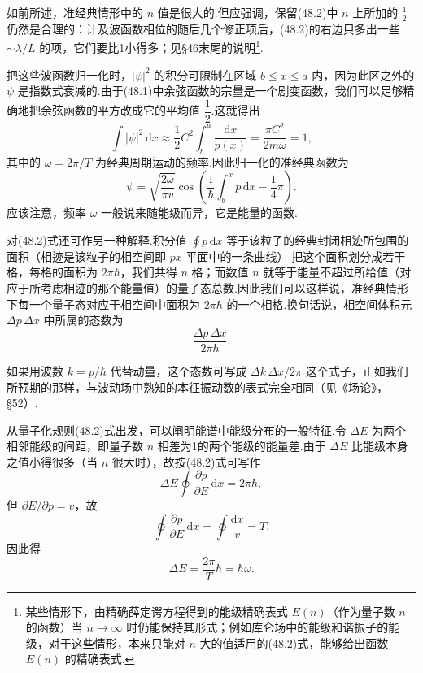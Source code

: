 如前所述，准经典情形中的 $n$ 值是很大的.但应强调，保留(48.2)中 $n$ 上所加的 $\frac{1}{2}$ 仍然是合理的：计及波函数相位的随后几个修正项后，(48.2)的右边只多出一些 $\sim\lambda/L$ 的项，它们要比1小得多；见§46末尾的说明\footnote{某些情形下，由精确薛定谔方程得到的能级精确表式 $E(n)$（作为量子数 $n$ 的函数）当 $n\to\infty$ 时仍能保持其形式；例如库仑场中的能级和谐振子的能级，对于这些情形，本来只能对 $n$ 大的值适用的(48.2)式，能够给出函数 $E(n)$ 的精确表式.}.

把这些波函数归一化时，$|\psi|^2$ 的积分可限制在区域 $b\leqslant x\leqslant a$ 内，因为此区之外的 $\psi$ 是指数式衰减的.由于(48.1)中余弦函数的宗量是一个剧变函数，我们可以足够精确地把余弦函数的平方改成它的平均值 $\dfrac{1}{2}$.这就得出
\begin{equation*}
  \int|\psi|^2\,\mathrm{d}x\approx\frac{1}{2}C^2\int_b^a\frac{\mathrm{d}x}{p(x)}
  =\frac{\pi C^2}{2m\omega}=1,
\end{equation*}
其中的 $\omega=2\pi/T$ 为经典周期运动的频率.因此归一化的准经典函数为
\begin{equation}
  \psi=\sqrt{\frac{2\omega}{\pi v}}\cos\left(\frac{1}{\hbar}\int_b^x p\,\mathrm{d}x-\frac{1}{4}\pi\right).
\end{equation}
应该注意，频率 $\omega$ 一般说来随能级而异，它是能量的函数.

对(48.2)式还可作另一种解释.积分值 $\oint p\,\mathrm{d}x$ 等于该粒子的经典封闭相迹所包围的面积（相迹是该粒子的相空间即 $px$ 平面中的一条曲线）.把这个面积划分成若干格，每格的面积为 $2\pi\hbar$，我们共得 $n$ 格；而数值 $n$ 就等于能量不超过所给值（对应于所考虑相迹的那个能量值）的量子态总数.因此我们可以这样说，准经典情形下每一个量子态对应于相空间中面积为 $2\pi\hbar$ 的一个相格.换句话说，相空间体积元 $\Delta p\,\Delta x$ 中所属的态数为
\begin{equation}
  \frac{\Delta p\,\Delta x}{2\pi\hbar}.
\end{equation}

如果用波数 $k=p/\hbar$ 代替动量，这个态数可写成 $\Delta k\,\Delta x/2\pi$ 这个式子，正如我们所预期的那样，与波动场中熟知的本征振动数的表式完全相同（见《场论》，§52）.

从量子化规则(48.2)式出发，可以阐明能谱中能级分布的一般特征.令 $\Delta E$ 为两个相邻能级的间距，即量子数 $n$ 相差为1的两个能级的能量差.由于 $\Delta E$ 比能级本身之值小得很多（当 $n$ 很大时），故按(48.2)式可写作
\begin{equation*}
  \Delta E\oint\frac{\partial p}{\partial E}\,\mathrm{d}x=2\pi\hbar,
\end{equation*}
但 $\partial E/\partial p=v$，故
\begin{equation*}
  \oint\frac{\partial p}{\partial E}\,\mathrm{d}x=\oint\frac{\mathrm{d}x}{v}=T.
\end{equation*}
因此得
\begin{equation}
  \Delta E=\frac{2\pi}{T}\hbar=\hbar\omega.
\end{equation}

